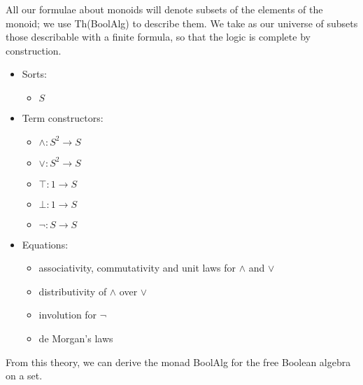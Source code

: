 \documentclass{article}
\newcommand{\maps}{\colon}
\begin{document}
All our formulae about monoids will denote subsets of the elements of the monoid; we use Th(BoolAlg) to describe them.  We take as our universe of subsets those describable with a finite formula, so that the logic is complete by construction.
\begin{center}
  \begin{itemize}
    \item Sorts:
    \begin{itemize}
      \item $S$
    \end{itemize}
    \item Term constructors:
    \begin{itemize}
      \item $\land\maps S^2 \to S$
      \item $\lor\maps S^2 \to S$
      \item $\top\maps 1 \to S$
      \item $\bot\maps 1 \to S$
      \item $\neg\maps S \to S$
    \end{itemize}
    \item Equations:
    \begin{itemize}
      \item associativity, commutativity and unit laws for $\land$ and $\lor$
      \item distributivity of $\land$ over $\lor$
      \item involution for $\neg$
      \item de Morgan's laws
    \end{itemize}
  \end{itemize}
\end{center}
From this theory, we can derive the monad BoolAlg for the free Boolean algebra on a set.
\end{document}
